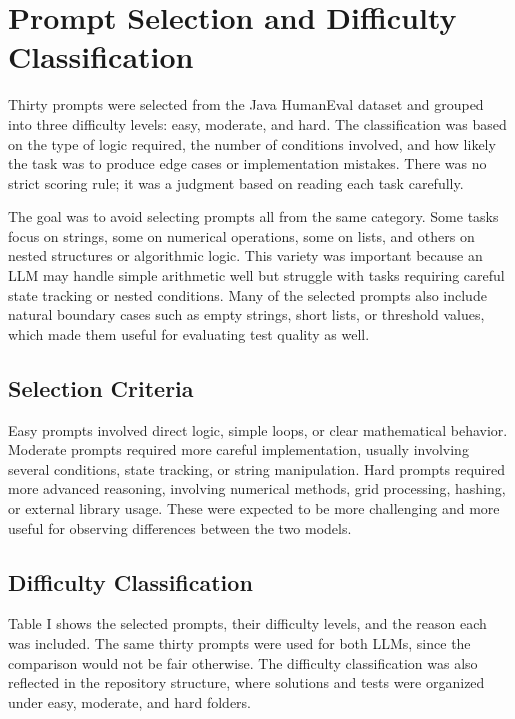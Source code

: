 \documentclass[journal]{IEEEtran}
\begin{document}
\section{Prompt Selection and Difficulty Classification}
Thirty prompts were selected from the Java HumanEval dataset and grouped into three difficulty levels: easy, moderate, and hard. The classification was based on the type of logic required, the number of conditions involved, and how likely the task was to produce edge cases or implementation mistakes. There was no strict scoring rule; it was a judgment based on reading each task carefully.

The goal was to avoid selecting prompts all from the same category. Some tasks focus on strings, some on numerical operations, some on lists, and others on nested structures or algorithmic logic. This variety was important because an LLM may handle simple arithmetic well but struggle with tasks requiring careful state tracking or nested conditions. Many of the selected prompts also include natural boundary cases such as empty strings, short lists, or threshold values, which made them useful for evaluating test quality as well.

\subsection{Selection Criteria}
Easy prompts involved direct logic, simple loops, or clear mathematical behavior. Moderate prompts required more careful implementation, usually involving several conditions, state tracking, or string manipulation. Hard prompts required more advanced reasoning, involving numerical methods, grid processing, hashing, or external library usage. These were expected to be more challenging and more useful for observing differences between the two models.

\subsection{Difficulty Classification}
Table I shows the selected prompts, their difficulty levels, and the reason each was included. The same thirty prompts were used for both LLMs, since the comparison would not be fair otherwise. The difficulty classification was also reflected in the repository structure, where solutions and tests were organized under easy, moderate, and hard folders.
\end{document}
